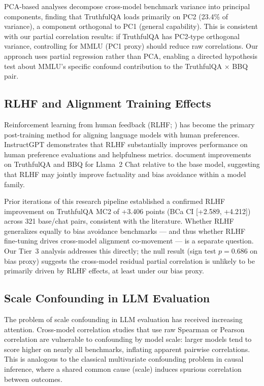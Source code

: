 PCA-based analyses \citep{anon2026pca} decompose cross-model benchmark variance into principal components, finding that TruthfulQA loads primarily on PC2 (23.4\% of variance), a component orthogonal to PC1 (general capability). This is consistent with our partial correlation results: if TruthfulQA has PC2-type orthogonal variance, controlling for MMLU (PC1 proxy) should reduce raw correlations. Our approach uses partial regression rather than PCA, enabling a directed hypothesis test about MMLU's specific confound contribution to the TruthfulQA $\times$ BBQ pair.

\subsection{RLHF and Alignment Training Effects}

Reinforcement learning from human feedback (RLHF; \citealt{stiennon2020rlhf,ouyang2022instructgpt}) has become the primary post-training method for aligning language models with human preferences. InstructGPT \citep{ouyang2022instructgpt} demonstrates that RLHF substantially improves performance on human preference evaluations and helpfulness metrics. \citet{touvron2023llama2} document improvements on TruthfulQA and BBQ for Llama~2 Chat relative to the base model, suggesting that RLHF may jointly improve factuality and bias avoidance within a model family.

Prior iterations of this research pipeline established a confirmed RLHF improvement on TruthfulQA MC2 of +3.406 points (BCa CI [+2.589, +4.212]) across 321 base/chat pairs, consistent with the literature. Whether RLHF generalizes equally to bias avoidance benchmarks --- and thus whether RLHF fine-tuning drives cross-model alignment co-movement --- is a separate question. Our Tier~3 analysis addresses this directly; the null result (sign test $p = 0.686$ on bias proxy) suggests the cross-model residual partial correlation is unlikely to be primarily driven by RLHF effects, at least under our bias proxy.

\subsection{Scale Confounding in LLM Evaluation}

The problem of scale confounding in LLM evaluation has received increasing attention. Cross-model correlation studies that use raw Spearman or Pearson correlation are vulnerable to confounding by model scale: larger models tend to score higher on nearly all benchmarks, inflating apparent pairwise correlations. This is analogous to the classical multivariate confounding problem in causal inference, where a shared common cause (scale) induces spurious correlation between outcomes.

